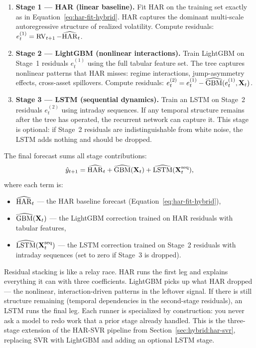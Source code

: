 \begin{enumerate}
  \item \textbf{Stage 1 --- HAR (linear baseline).}  Fit HAR on the
        training set exactly as in
        Equation~\eqref{eq:har-fit-hybrid}.  HAR captures the dominant
        multi-scale autoregressive structure of realized volatility.
        Compute residuals: $e_t^{(1)} = \operatorname{RV}_{t+1} -
        \widehat{\operatorname{HAR}}_t$.
  \item \textbf{Stage 2 --- LightGBM (nonlinear interactions).}  Train
        LightGBM on Stage~1 residuals $e_t^{(1)}$ using the full
        tabular feature set.  The tree captures nonlinear patterns that
        HAR misses: regime interactions, jump-asymmetry effects,
        cross-asset spillovers.  Compute residuals:
        $e_t^{(2)} = e_t^{(1)} - \widehat{\text{GBM}}(e_t^{(1)},
        \mathbf{X}_t)$.
  \item \textbf{Stage 3 --- LSTM (sequential dynamics).}  Train an
        LSTM on Stage~2 residuals $e_t^{(2)}$ using intraday sequences.
        If any temporal structure remains after the tree has operated,
        the recurrent network can capture it.  This stage is optional:
        if Stage~2 residuals are indistinguishable from white noise, the
        LSTM adds nothing and should be dropped.
\end{enumerate}

The final forecast sums all stage contributions:
\begin{equation}\label{eq:resid-stack-3}
  \hat{y}_{t+1} = \widehat{\operatorname{HAR}}_t
    + \widehat{\text{GBM}}(\mathbf{X}_t)
    + \widehat{\text{LSTM}}(\mathbf{X}_t^{\text{seq}}),
\end{equation}
where each term is:
\begin{itemize}
  \item $\widehat{\operatorname{HAR}}_t$ --- the HAR baseline forecast
        (Equation~\eqref{eq:har-fit-hybrid}),
  \item $\widehat{\text{GBM}}(\mathbf{X}_t)$ --- the LightGBM correction
        trained on HAR residuals with tabular features,
  \item $\widehat{\text{LSTM}}(\mathbf{X}_t^{\text{seq}})$ --- the LSTM
        correction trained on Stage~2 residuals with intraday
        sequences (set to zero if Stage~3 is dropped).
\end{itemize}

\begin{intuition}
Residual stacking is like a relay race.  HAR runs the first leg and
explains everything it can with three coefficients.  LightGBM picks up
what HAR dropped --- the nonlinear, interaction-driven patterns in the
leftover signal.  If there is still structure remaining (temporal
dependencies in the second-stage residuals), an LSTM runs the final
leg.  Each runner is specialized by construction: you never ask a model
to redo work that a prior stage already handled.  This is the
three-stage extension of the HAR-SVR pipeline from
Section~\ref{sec:hybrid:har-svr}, replacing SVR with LightGBM and
adding an optional LSTM stage.
\end{intuition}

